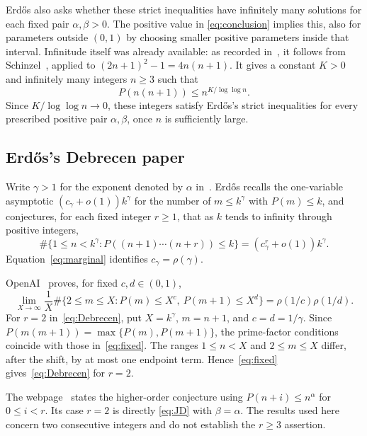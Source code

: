 \documentclass[11pt,a4paper]{amsart}
\begin{document}
Erd\H{o}s also asks whether these strict inequalities have infinitely
many solutions for each fixed pair $\alpha,\beta>0$. The positive value in
\eqref{eq:conclusion} implies this, also for parameters outside $(0,1)$
by choosing smaller positive parameters inside that interval.
Infinitude itself was already available: as recorded in~\cite{Bloom928},
it follows from Schinzel~\cite[Theorem~14, p.~231]{Schinzel1967}, applied
to $(2n+1)^2-1=4n(n+1)$. It gives a constant $K>0$ and infinitely many
integers $n\ge3$ such that
\[
 P(n(n+1))\le n^{K/\log\log n}.
\]
Since $K/\log\log n\to0$, these integers satisfy Erd\H{o}s's strict
inequalities for every prescribed positive pair $\alpha,\beta$, once
$n$ is sufficiently large.

\subsection{Erd\H{o}s's Debrecen paper}
Write $\gamma>1$ for the exponent denoted by $\alpha$
in~\cite[pp.~272--273]{Erdos1976Debrecen}. Erd\H{o}s recalls the
one-variable asymptotic $(c_\gamma+o(1))k^\gamma$ for the number of
$m\le k^\gamma$ with $P(m)\le k$, and conjectures, for each fixed integer
$r\ge1$, that as $k$ tends to infinity through positive integers,
\begin{equation}\label{eq:Debrecen}
 \#\{1\le n<k^\gamma:P((n+1)\cdots(n+r))\le k\}
  =(c_\gamma^r+o(1))k^\gamma.
\end{equation}
Equation~\eqref{eq:marginal} identifies $c_\gamma=\rho(\gamma)$.

OpenAI~\cite[(11.7), p.~80]{OpenAI2026} proves, for fixed $c,d\in(0,1)$,
\begin{equation}\label{eq:fixed}
 \lim_{X\to\infty}\frac1X
 \#\{2\le m\le X:P(m)\le X^c,\ P(m+1)\le X^d\}
 =\rho(1/c)\rho(1/d).
\end{equation}
For $r=2$ in~\eqref{eq:Debrecen}, put $X=k^\gamma$, $m=n+1$, and
$c=d=1/\gamma$. Since $P(m(m+1))=\max\{P(m),P(m+1)\}$, the
prime-factor conditions coincide with those in~\eqref{eq:fixed}.
The ranges $1\le n<X$ and $2\le m\le X$ differ,
after the shift, by at most one endpoint term. Hence~\eqref{eq:fixed}
gives~\eqref{eq:Debrecen} for $r=2$.

The webpage~\cite{Bloom928} states the higher-order conjecture using
$P(n+i)\le n^\alpha$ for $0\le i<r$. Its case $r=2$ is directly
\eqref{eq:JD} with $\beta=\alpha$. The results used here concern two
consecutive integers and do not establish the $r\ge3$ assertion.

\end{document}
